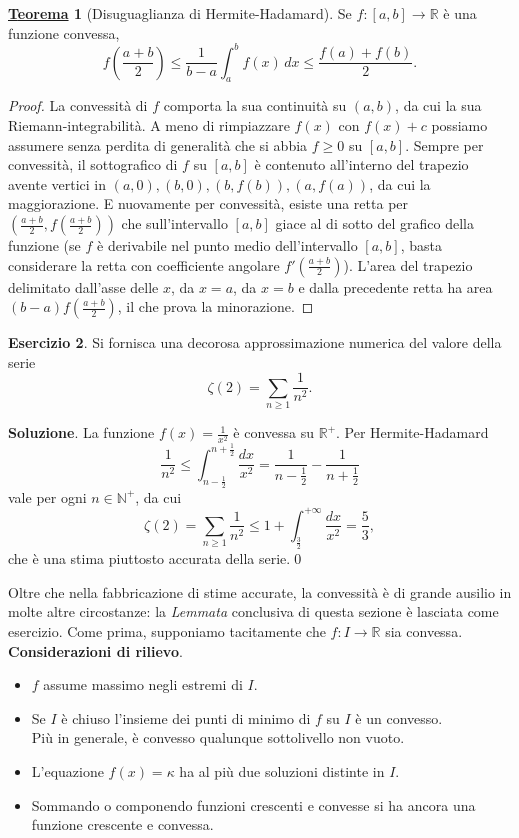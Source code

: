 \documentclass[a4paper,twoside]{article}
\newcommand{\R}{\mathbb{R}}
\theoremstyle{definition}
\newtheorem{theorem}{\color{Red}\underline{\textrm Teorema}}
\newenvironment{theo}
  {\begin{shaded}\begin{theorem}}
  {\end{theorem}\end{shaded}}
\newtheorem{ex}[theorem]{Esercizio}
\numberwithin{theorem}{section}
\begin{document}
\begin{theo}[Disuguaglianza di Hermite-Hadamard]\label{HermiteHadamard}
Se $f:[a,b]\to\mathbb{R}$ è una funzione convessa,
$$ f\left(\frac{a+b}{2}\right) \leq \frac{1}{b-a}\int_{a}^{b}f(x)\,dx \leq \frac{f(a)+f(b)}{2}.$$
\end{theo}
\begin{proof} La convessità di $f$ comporta la sua continuità su $(a,b)$, da cui la sua Riemann-integrabilità. A meno di rimpiazzare $f(x)$ con $f(x)+c$ possiamo assumere senza perdita di generalità che si abbia $f\geq 0$ su $[a,b]$. Sempre per convessità, il sottografico di $f$ su $[a,b]$ è contenuto all'interno del trapezio avente vertici in $(a,0),(b,0),(b,f(b)),(a,f(a))$, da cui la maggiorazione.
E nuovamente per convessità, esiste una retta per $\left(\frac{a+b}{2},f\left(\frac{a+b}{2}\right)\right)$ che sull'intervallo $[a,b]$ giace al di sotto del grafico della funzione (se $f$ è derivabile nel punto medio dell'intervallo $[a,b]$, basta considerare la retta con coefficiente angolare $f'\left(\frac{a+b}{2}\right)$). L'area del trapezio delimitato dall'asse delle $x$, da $x=a$, da $x=b$ e dalla precedente retta ha area $(b-a)f\left(\frac{a+b}{2}\right)$, il che prova la minorazione.\end{proof}


\begin{ex} Si fornisca una decorosa approssimazione numerica del valore della serie $$\zeta(2)=\sum_{n\geq 1}\frac{1}{n^2}.$$
\end{ex}

\textbf{Soluzione}. La funzione $f(x)=\frac{1}{x^2}$ è convessa su $\mathbb{R}^+$. Per Hermite-Hadamard
$$ \frac{1}{n^2}\leq \int_{n-\frac{1}{2}}^{n+\frac{1}{2}}\frac{dx}{x^2}=\frac{1}{n-\frac{1}{2}}-\frac{1}{n+\frac{1}{2}} $$
vale per ogni $n\in\mathbb{N}^+$, da cui
$$\zeta(2)=\sum_{n\geq 1}\frac{1}{n^2}\leq 1+\int_{\frac{3}{2}}^{+\infty}\frac{dx}{x^2}=\frac{5}{3}, $$
che è una stima piuttosto accurata della serie.\qed



Oltre che nella fabbricazione di stime accurate, la convessità è di grande ausilio in molte altre circostanze: la \emph{Lemmata} conclusiva di questa sezione è lasciata come esercizio. Come prima, supponiamo tacitamente che $f:I\to\R$ sia convessa.\\



\textbf{Considerazioni di rilievo}. 
\begin{itemize}
 \item $f$ assume massimo negli estremi di $I$.
 \item Se $I$ è chiuso l'insieme dei punti di minimo di $f$ su $I$ è un convesso.\\ Più in generale, è convesso qualunque sottolivello non vuoto.
 \item L'equazione $f(x)=\kappa$ ha al più due soluzioni distinte in $I$.
 \item Sommando o componendo funzioni crescenti e convesse si ha ancora una funzione crescente e convessa.
\end{itemize}
\end{document}
